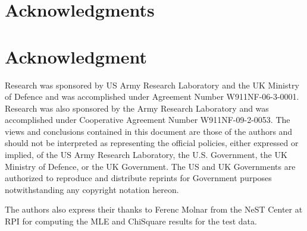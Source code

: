 \documentclass[10pt,journal,cspaper,compsoc]{IEEEtran}
\begin{document}
\ifCLASSOPTIONcompsoc
\section*{Acknowledgments}
\else
\section*{Acknowledgment}
\fi

Research was sponsored by US Army Research Laboratory and the UK  Ministry of Defence and was accomplished under Agreement Number W911NF-06-3-0001. Research was also sponsored by the Army Research Laboratory and was accomplished under Cooperative Agreement Number W911NF-09-2-0053. The views and conclusions contained in this document are those of the authors and should not be interpreted as representing the official policies, either expressed or implied, of the US Army Research Laboratory, the U.S.  Government, the UK Ministry of Defence, or the UK Government. The US and UK Governments are authorized to reproduce and distribute reprints for Government purposes notwithstanding any copyright notation hereon.

The authors also express their thanks to Ferenc Molnar from the NeST Center at RPI for computing the MLE and ChiSquare results for the test data.
\ifCLASSOPTIONcaptionsoff
  \newpage
\fi
\end{document}
